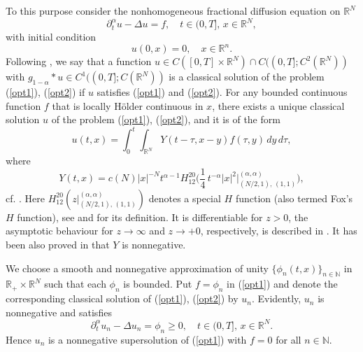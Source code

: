 \documentclass[10pt]{article}
\newcommand{\iR}{\mathbb{R}}
\newcommand{\iN}{\mathbb{N}}
\begin{document}
To this purpose consider the nonhomogeneous fractional diffusion
equation on $\iR^N$
\begin{equation} \label{opt1}
\partial_t^\alpha u-\Delta u=f,\quad t\in (0,T],\,x\in \iR^N,
\end{equation}
with initial condition
\begin{equation} \label{opt2}
u(0,x)=0,\quad x\in \iR^n.
\end{equation}
Following \cite{Koch}, we say that a function $u\in C([0,T]\times
\iR^N)\cap C((0,T];C^2(\iR^N))$ with $g_{1-\alpha}\ast u\in
C^1((0,T];C(\iR^N))$ is a classical solution of the problem
(\ref{opt1}), (\ref{opt2}) if $u$ satisfies (\ref{opt1}) and
(\ref{opt2}). For any bounded continuous function $f$ that is
locally H\"older continuous in $x$, there exists a unique classical
solution $u$ of the problem (\ref{opt1}), (\ref{opt2}), and it is of
the form
\begin{equation} \label{opt3}
u(t,x)=\int_0^t \int_{\iR^N} Y(t-\tau,x-y)f(\tau,y)\,dy\,d\tau,
\end{equation}
where
\[
Y(t,x)=c(N)|x|^{-N}t^{\alpha-1}
H^{20}_{12}\Big(\frac{1}{4}\,t^{-\alpha}|x|^2\Big|{}^{(\alpha,\alpha)}_{(N/2,1),\,(1,1)}\Big),
\]
cf. \cite{Koch}. Here
$H^{20}_{12}(z|{}^{(\alpha,\alpha)}_{(N/2,1),\,(1,1)})$ denotes a
special $H$ function (also termed Fox's $H$ function), see
\cite[Section 1.12]{KST} and \cite{Koch} for its definition. It is
differentiable for $z>0$, the asymptotic behaviour for $z\to \infty$
and $z\to +0$, respectively, is described in \cite[formulae (3.9)
and (3.14)]{Koch}. It has been also proved in \cite{Koch} that $Y$
is nonnegative.

We choose a smooth and nonnegative approximation of unity
$\{\phi_n(t,x)\}_{n\in \iN}$ in $\iR_+\times \iR^N$ such that each
$\phi_n$ is bounded. Put $f=\phi_n$ in (\ref{opt1}) and denote the
corresponding classical solution of (\ref{opt1}), (\ref{opt2}) by
$u_n$. Evidently, $u_n$ is nonnegative and satisfies
\[
\partial_t^\alpha u_n-\Delta u_n=\phi_n\ge  0,\quad t\in (0,T],\,x\in
\iR^N.
\]
Hence $u_n$ is a nonnegative supersolution of (\ref{opt1}) with
$f=0$ for all $n\in \iN$.
\end{document}
